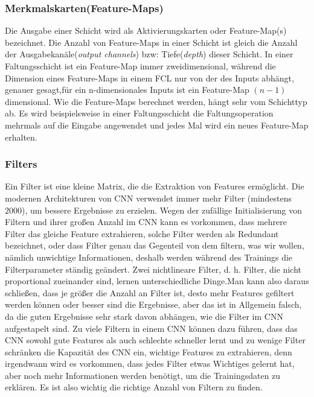 \documentclass[12pt,a4paper]{scrartcl}
\numberwithin{equation}{section}
\begin{document}
\subsubsection{Merkmalskarten(Feature-Maps)}
Die Ausgabe einer Schicht wird als Aktivierungskarten oder Feature-Map(s) bezeichnet. Die Anzahl von Feature-Maps in einer Schicht ist gleich die Anzahl der Ausgabekanäle(\textit{output channels}) bzw: Tiefe(\textit{depth}) dieser Schicht.
In einer Faltungsschicht ist ein Feature-Map immer zweidimensional, während die Dimension eines Feature-Maps in einem \ac{FCL} nur von der des Inputs abhängt, genauer gesagt,für ein n-dimensionales Inputs ist ein Feature-Map $ (n-1) $dimensional.
Wie die Feature-Maps berechnet werden, hängt sehr vom Schichttyp ab. Es wird beispielsweise in einer Faltungsschicht die Faltungsoperation mehrmals auf die Eingabe angewendet und jedes Mal wird ein neues Feature-Map erhalten.

\subsubsection{Filters}\label{Filter}
Ein Filter ist eine kleine Matrix, die die Extraktion von Features ermöglicht.
Die modernen Architekturen von \ac{CNN} verwendet immer mehr Filter (mindestens $ 2000 $), um bessere Ergebnisse zu erzielen. Wegen der zufällige Initialisierung von Filtern und ihrer großen Anzahl im \ac{CNN} kann es vorkommen, dass mehrere Filter das gleiche Feature extrahieren, solche Filter werden als Redundant bezeichnet, oder dass Filter genau das Gegenteil von dem filtern, was wir wollen, nämlich unwichtige Informationen, deshalb werden während des Trainings die Filterparameter ständig geändert. Zwei nichtlineare Filter, d. h. Filter, die nicht proportional zueinander sind, lernen unterschiedliche Dinge.Man kann also daraus schließen, dass je größer die Anzahl an Filter ist, desto mehr Features gefiltert werden können oder besser sind die Ergebnisse, aber das ist in Allgemein falsch, da die guten Ergebnisse sehr stark davon abhängen, wie die Filter im CNN aufgestapelt sind. Zu viele Filtern in einem \ac{CNN} können dazu führen, dass das \ac{CNN} sowohl gute Features als auch schlechte schneller lernt und zu wenige Filter schränken die Kapazität des \ac{CNN} ein,  wichtige Features zu extrahieren, denn irgendwann wird es vorkommen, dass jedes Filter etwas Wichtiges gelernt hat, aber noch mehr Informationen werden benötigt, um die Trainingsdaten zu erklären.
Es ist also wichtig die richtige Anzahl von Filtern zu finden.
\end{document}
